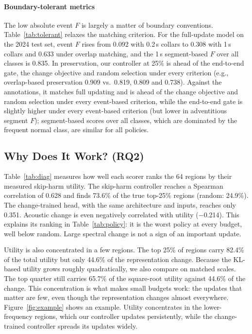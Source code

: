 \paragraph*{Boundary-tolerant metrics} The low absolute event $F$ is largely a matter of boundary conventions. Table~\ref{tab:tolerant} relaxes the matching criterion. For the full-update model on the 2024 test set, event $F$ rises from 0.092 with 0.2\,s collars to 0.308 with 1\,s collars and 0.633 under overlap matching, and the 1\,s segment-based $F$ over all classes is 0.835. In preservation, our controller at 25\% is ahead of the end-to-end gate, the change objective and random selection under every criterion (e.g., overlap-based preservation 0.909 vs.\ 0.819, 0.809 and 0.738). Against the annotations, it matches full updating and is ahead of the change objective and random selection under every event-based criterion, while the end-to-end gate is slightly higher under every event-based criterion (but lower in adventitious segment $F$); segment-based scores over all classes, which are dominated by the frequent normal class, are similar for all policies.

\toltable

\diagtable

\subsection{Why Does It Work? (RQ2)}
Table~\ref{tab:diag} measures how well each scorer ranks the 64 regions by their measured skip-harm utility. The skip-harm controller reaches a Spearman correlation of 0.628 and finds 73.6\% of the true top-25\% regions (random: 24.9\%). The change-trained head, with the same architecture and inputs, reaches only 0.351. Acoustic change is even negatively correlated with utility (\ensuremath{-}0.214). This explains its ranking in Table~\ref{tab:policy}: it is the worst policy at every budget, well below random. Large spectral change is not a sign of an important update.

Utility is also concentrated in a few regions. The top 25\% of regions carry 82.4\% of the total utility but only 44.6\% of the representation change. Because the KL-based utility grows roughly quadratically, we also compare on matched scales. The top quarter still carries 65.7\% of the square-root utility against 44.6\% of the change. This concentration is what makes small budgets work: the updates that matter are few, even though the representation changes almost everywhere. Figure~\ref{fig:example} shows an example. Utility concentrates in the lower-frequency regions, which our controller updates persistently, while the change-trained controller spreads its updates widely.

